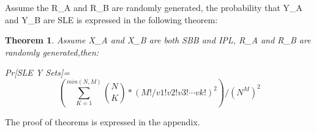 \documentclass{article}
\newtheorem{theorem}{Theorem}[section]
\begin{document}
Assume the R\_A and R\_B are randomly generated, the probability that Y\_A and Y\_B are SLE is expressed in the following theorem:
\begin{theorem}
Assume X\_A and X\_B are both SBB and IPL, R\_A and R\_B are randomly generated,then:

Pr[SLE Y Sets]=
\begin{displaymath}
(\sum_{K=1}^{min(N,M)} \binom{N}{K} * (M!/v1!v2!v3! \cdots vk!) ^ 2 )/(N^M)^2
\end{displaymath}
\end{theorem}
The proof of theorems is expressed in the appendix.

%
\end{document}
